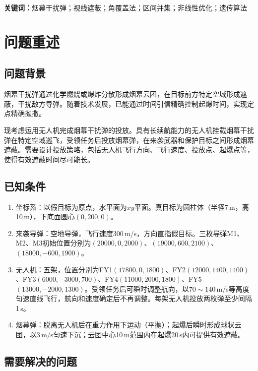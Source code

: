 \documentclass[a4paper]{ctexart}
\begin{document}
\vspace{1em}
\noindent\textbf{关键词：}烟幕干扰弹；视线遮蔽；角覆盖法；区间并集；非线性优化；遗传算法

\newpage
\setcounter{page}{1}

\section{问题重述}

\subsection{问题背景}

烟幕干扰弹通过化学燃烧或爆炸分散形成烟幕云团，在目标前方特定空域形成遮蔽，干扰敌方导弹。随着技术发展，已能通过时间引信精确控制起爆时间，实现定点精确抛撒。

现考虑运用无人机完成烟幕干扰弹的投放。具有长续航能力的无人机挂载烟幕干扰弹在特定空域巡飞，受领任务后投放烟幕弹，在来袭武器和保护目标之间形成烟幕遮蔽。需要设计投放策略，包括无人机飞行方向、飞行速度、投放点、起爆点等，使得有效遮蔽时间尽可能长。

\subsection{已知条件}

\begin{enumerate}[label=(\arabic*)]
  \item 坐标系：以假目标为原点，水平面为$xy$平面。真目标为圆柱体（半径7\,m，高10\,m），下底面圆心$(0, 200, 0)$。
  \item 来袭导弹：空地导弹，飞行速度300\,m/s，方向直指假目标。三枚导弹M1、M2、M3初始位置分别为$(20000, 0, 2000)$、$(19000, 600, 2100)$、$(18000, -600, 1900)$。
  \item 无人机：五架，位置分别为FY1$(17800, 0, 1800)$、FY2$(12000, 1400, 1400)$、FY3$(6000, -3000, 700)$、FY4$(11000, 2000, 1800)$、FY5$(13000, -2000, 1300)$。受领任务后可瞬时调整航向，以$70\sim140$\,m/s等高度匀速直线飞行，航向和速度确定后不再调整。每架无人机投放两枚弹至少间隔1\,s。
  \item 烟幕弹：脱离无人机后在重力作用下运动（平抛）；起爆后瞬时形成球状云团，以3\,m/s匀速下沉；云团中心10\,m范围内在起爆20\,s内可提供有效遮蔽。
\end{enumerate}

\subsection{需要解决的问题}
\end{document}
